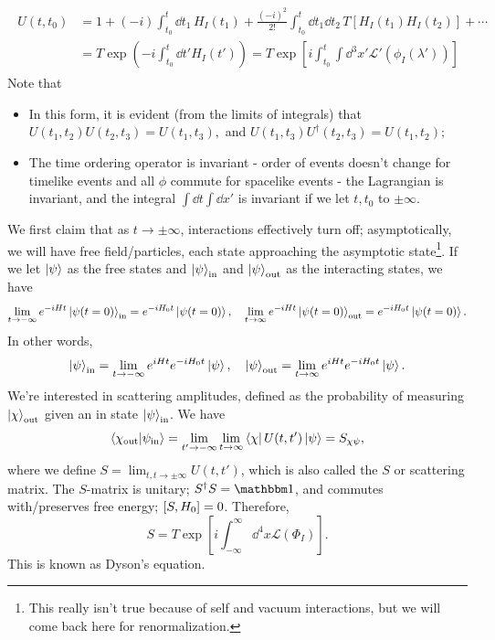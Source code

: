 \documentclass{article}
\begin{document}
\begin{align}
    \begin{split}
        U(t,t_0)&=1+(-i)\int^t_{t_0}\dd t_1\,H_I(t_1)+\frac{(-i)^2}{2!}\int^t_{t_0}\dd t_1\dd t_2\,T[H_I(t_1)H_I(t_2)]+\cdots\\
        &=T\exp\left(-i\int^t_{t_0}\dd t'H_I(t')\right)=T\exp\left[i\int^t_{t_0}\int\dd^3x'\mathcal L'(\phi_I(\lambda'))\right]
    \end{split}
\end{align}
Note that 
\begin{itemize}
    \item In this form, it is evident (from the limits of integrals) that $U(t_1,t_2)U(t_2,t_3)=U(t_1,t_3),$ and $U(t_1,t_3)U^\dag(t_2,t_3)=U(t_1,t_2);$
    \item The time ordering operator is invariant - order of events doesn't change for timelike events and all $\phi$ commute for spacelike events - the Lagrangian is invariant, and the integral $\int\dd t\int\dd x'$ is invariant if we let $t,t_0$ to $\pm\infty$.
\end{itemize}

We first claim that as $t\to\pm\infty$, interactions effectively turn off; asymptotically, we will have free field/particles, each state approaching the asymptotic state\footnote{This really isn't true because of self and vacuum interactions, but we will come back here for renormalization.}. If we let $\ket\psi$ as the free states and $\ket\psi_\text{in}$ and $\ket\psi_\text{out}$ as the interacting states, we have 
$$\lim_{t\to-\infty}e^{-iHt}\ket{\psi(t=0)}_\text{in}=e^{-iH_0t}\ket{\psi(t=0)},\quad \lim_{t\to\infty}e^{-iHt}\ket{\psi(t=0)}_\text{out}=e^{-iH_0t}\ket{\psi(t=0)}.$$
In other words, 
$$\ket\psi_\text{in}=\lim_{t\to-\infty}e^{iHt}e^{-iH_0t}\ket\psi,\quad\ket\psi_\text{out}=\lim_{t\to\infty}e^{iHt}e^{-iH_0t}\ket\psi.$$
We're interested in scattering amplitudes, defined as the probability of measuring $\ket\chi_\text{out}$ given an in state $\ket\psi_\text{in}$. We have 
$$\braket{\chi_\text{out}}{\psi_\text{in}}=\lim_{t'\to-\infty}\lim_{t\to\infty}\bra\chi U(t,t')\ket\psi=S_{\chi\psi},$$
where we define $S=\lim_{t,t\to\pm\infty}U(t,t')$, which is also called the $S$ or scattering matrix. The $S$-matrix is unitary; $S^\dag S=\mathbbm 1$, and commutes with/preserves free energy; $\comm{S}{H_0}=0$. Therefore, 
\begin{equation}
    S=T\exp\left[i\int^\infty_{-\infty}\dd^4x\mathcal L(\Phi_I)\right].
\end{equation}
This is known as Dyson's equation. 
\end{document}
